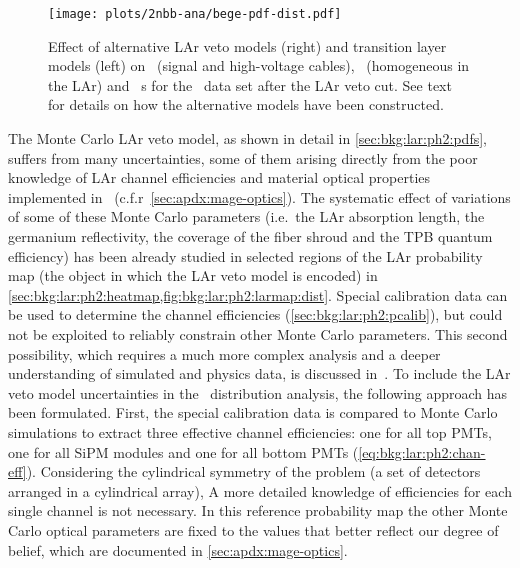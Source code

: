 \begin{figure}
  \centering
  \texttt{[image: plots/2nbb-ana/bege-pdf-dist.pdf]}
  \caption{%
    Effect of alternative LAr veto models (right) and transition layer models (left) on
    \kvn\ (signal and high-voltage cables), \kvz\ (homogeneous in the LAr) and \nnbb\
    \pdf{}s for the \enrBEGeII\ data set after the LAr veto cut. See text for details on how
    the alternative models have been constructed.
  }\label{fig:2nbb-ana:pdf-dist}
\end{figure}

\begin{description}[wide]

  \item[LAr veto model] The Monte Carlo LAr veto model, as shown in detail in
    \cref{sec:bkg:lar:ph2:pdfs}, suffers from many uncertainties, some of them arising
    directly from the poor knowledge of LAr channel efficiencies and material optical
    properties implemented in \mage\ (c.f.r~\cref{sec:apdx:mage-optics}). The systematic
    effect of variations of some of these Monte Carlo parameters (i.e.~the LAr absorption
    length, the germanium reflectivity, the coverage of the fiber shroud and the TPB
    quantum efficiency) has been already studied in selected regions of the LAr
    probability map (the object in which the LAr veto model is encoded) in
    \cref{sec:bkg:lar:ph2:heatmap,fig:bkg:lar:ph2:larmap:dist}. Special calibration data
    can be used to determine the channel efficiencies (\cref{sec:bkg:lar:ph2:pcalib}), but
    could not be exploited to reliably constrain other Monte Carlo parameters. This second
    possibility, which requires a much more complex analysis and a deeper understanding of
    simulated and physics data, is discussed in~\cite{Wiesinger2021}.
    \newpar
    To include the LAr veto model uncertainties in the \nnbb\ distribution analysis, the
    following approach has been formulated. First, the special calibration data is
    compared to Monte Carlo simulations to extract three effective channel efficiencies:
    one for all top PMTs, one for all SiPM modules and one for all bottom PMTs
    (\cref{eq:bkg:lar:ph2:chan-eff}). Considering the cylindrical symmetry of the problem
    (a set of detectors arranged in a cylindrical array), A more detailed knowledge of
    efficiencies for each single channel is not necessary. In this reference probability
    map the other Monte Carlo optical parameters are fixed to the values that better
    reflect our degree of belief, which are documented in \cref{sec:apdx:mage-optics}.

\end{description}
